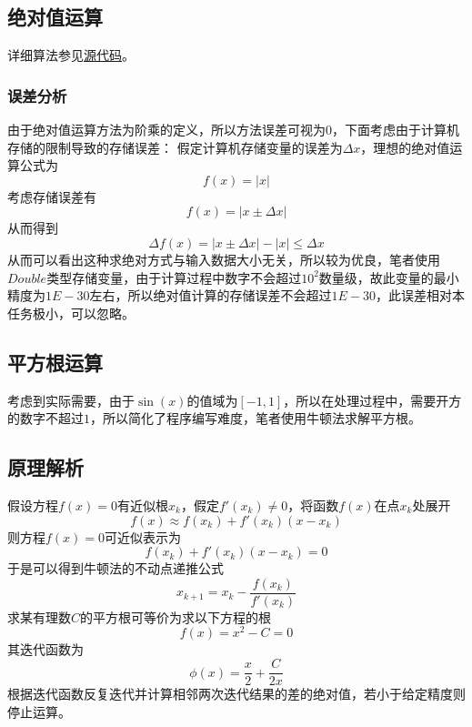 \documentclass[lang=cn,11pt,a4paper]{elegantpaper}
\begin{document}
\subsection{绝对值运算}
详细算法参见\href{https://github.com/Antonio-Chan/SineCalculate}{源代码}。
\subsubsection{误差分析}
由于绝对值运算方法为阶乘的定义，所以方法误差可视为0，下面考虑由于计算机存储的限制导致的存储误差：
假定计算机存储变量的误差为$\Delta x$，理想的绝对值运算公式为
\begin{equation}
  f(x)=|x|
\end{equation}
考虑存储误差有
\begin{equation}
  f(x)=|x\pm \Delta x|
\end{equation}
从而得到
\begin{equation}
  \Delta f(x)=|x\pm \Delta x|-|x| \leq \Delta x
\end{equation}
从而可以看出这种求绝对方式与输入数据大小无关，所以较为优良，笔者使用$Double$类型存储变量，由于计算过程中数字不会超过$10^2$数量级，故此变量的最小精度为$1E-30$左右，所以绝对值计算的存储误差不会超过$1E-30$，此误差相对本任务极小，可以忽略。
\subsection{平方根运算}
考虑到实际需要，由于$\sin(x)$的值域为$[-1,1]$，所以在处理过程中，需要开方的数字不超过$1$，所以简化了程序编写难度，笔者使用牛顿法求解平方根。
\subsection{原理解析}
假设方程$f(x)=0$有近似根$x_k$，假定$f'(x_k)\neq 0$，将函数$f(x)$在点$x_k$处展开
\begin{equation}
  f(x)\approx f(x_k)+f'(x_k)(x-x_k)
\end{equation}
则方程$f(x)=0$可近似表示为
\begin{equation}
  f(x_k)+f'(x_k)(x-x_k)=0
\end{equation}
于是可以得到牛顿法的不动点递推公式
\begin{equation}
  x_{k+1}=x_k-\frac{f(x_k)}{f'(x_k)}
\end{equation}
求某有理数$C$的平方根可等价为求以下方程的根
\begin{equation}
  f(x)=x^2-C=0
\end{equation}
其迭代函数为
\begin{equation}
  \phi(x)=\frac{x}{2}+\frac{C}{2x}
\end{equation}
根据迭代函数反复迭代并计算相邻两次迭代结果的差的绝对值，若小于给定精度则停止运算。
\end{document}
